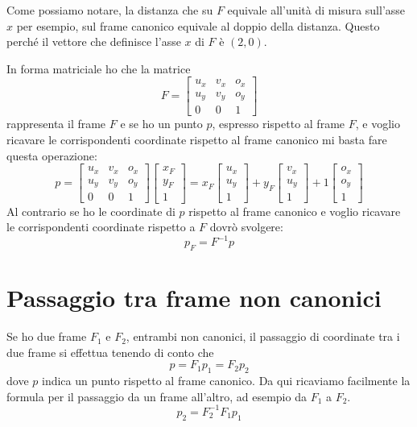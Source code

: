 Come possiamo notare, la distanza che su $F$ equivale all'unit\`a di misura	sull'asse $x$ per esempio, sul frame
canonico equivale al doppio della distanza. Questo perch\'e il vettore che definisce l'asse $x$ di $F$ \`e $(2, 0)$.

In forma matriciale ho che la matrice
\[
	F = \begin{bmatrix}
		u_x & v_x & o_x \\
		u_y & v_y & o_y \\
		0   & 0   & 1
	\end{bmatrix}
\]
rappresenta il frame $F$ e se ho un punto $p$, espresso rispetto al frame $F$, e voglio ricavare le corrispondenti
coordinate rispetto al frame canonico mi basta fare questa operazione:
\[
	p = \begin{bmatrix}
		u_x & v_x & o_x \\
		u_y & v_y & o_y \\
		0   & 0   & 1
	\end{bmatrix}
	\begin{bmatrix}
		x_F \\ y_F \\ 1
	\end{bmatrix} =
	x_F \begin{bmatrix}
		u_x \\ u_y \\ 1
	\end{bmatrix} +
	y_F \begin{bmatrix}
		v_x \\ u_y \\ 1
	\end{bmatrix} +
	1 \begin{bmatrix}
		o_x \\ o_y \\ 1
	\end{bmatrix}
\]
Al contrario se ho le coordinate di $p$ rispetto al frame canonico e voglio ricavare le corrispondenti coordinate rispetto
a $F$ dovr\`o svolgere:
\[ p_F = F^{-1} p \]

\section{Passaggio tra frame non canonici}
Se ho due frame $F_1$ e $F_2$, entrambi non canonici, il passaggio di coordinate tra i due frame si effettua tenendo di
conto che
\[ p = F_1 p_1 = F_2 p_2 \]
dove $p$ indica un punto rispetto al frame canonico. Da qui ricaviamo facilmente la formula per il passaggio da un frame
all'altro, ad esempio da $F_1$ a $F_2$.
\[ p_2 = F_2^{-1} F_1 p_1 \]

